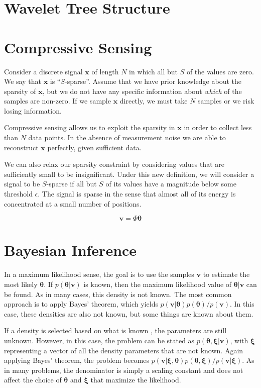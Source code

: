 \documentclass{IEEEtran}
\newcommand{\bfx}{\mathbf{x}}
\newcommand{\bfv}{\mathbf{v}}
\newcommand{\bftheta}{\mathbf{\theta}}
\begin{document}
\section{Wavelet Tree Structure}


\section{Compressive Sensing}
Consider a discrete signal $\bfx$ of length $N$ in which all but $S$ of the values are zero. We say that $\bfx$ is ``$S$-sparse''.  Assume that we have prior knowledge about the sparsity of $\bfx$, but we do not have any specific information about \emph{which} of the samples are non-zero. If we sample $\bfx$ directly, we must take $N$ samples or we risk losing information.

Compressive sensing allows us to exploit the sparsity in $\bfx$ in order to collect less than $N$ data points.  In the absence of measurement noise we are able to reconstruct $\bfx$ perfectly, given sufficient data.

We can also relax our sparsity constraint by considering values that are sufficiently small to be insignificant.  Under this new definition, we will consider a signal to be $S$-sparse if all but $S$ of its values have a magnitude below some threshold $\epsilon$.  The signal is sparse in the sense that almost all of its energy is concentrated at a small number of positions.

\begin{equation}
  \label{eq:sense}
  \bfv = \Phi \bftheta
\end{equation}



\section{Bayesian Inference}

In a maximum likelihood sense, the goal is to use the samples
$\mathbf{v}$ to estimate the most likely $\mathbf{\theta}$.  If $p(\mathbf{\theta}|\mathbf{v})$ is known, then the
maximum likelihood value of $\mathbf{\theta}|\mathbf{v}$ can be
found.  As in many cases, this density is not known.  The most common
approach is to apply Bayes' theorem, which yields
$p(\mathbf{v}|\mathbf{\theta})p(\mathbf{\theta})/p(\mathbf{v})$.  In
  this case, these densities are also not known, but some things are
  known about them.

If a density is selected based on what is known , the parameters are
still unknown.  However, in this case, the problem can be stated as
$p(\mathbf{\theta},\mathbf{\xi}|\mathbf{v})$, with $\mathbf{\xi}$
representing a vector of all the density parameters that are not
known.  Again applying Bayes' theorem, the problem becomes
$p(\mathbf{v}|\mathbf{\xi},\mathbf{\theta})p(\mathbf{\theta},\mathbf{\xi})/p(\mathbf{v}|\mathbf{\xi})$.
As in many problems, the denominator is simply a scaling constant and
does not affect the choice of $\mathbf{\theta}$ and $\mathbf{\xi}$
that maximize the likelihood.  
\end{document}
